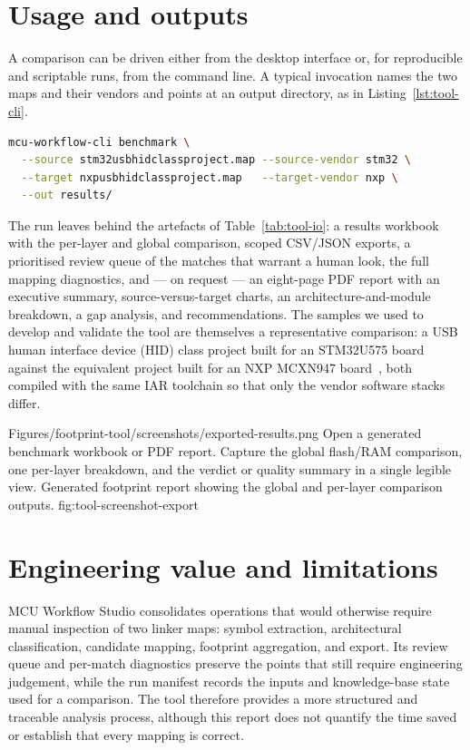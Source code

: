 \section{Usage and outputs}
\label{sec:tool-usage}

A comparison can be driven either from the desktop interface or, for reproducible and scriptable
runs, from the command line. A typical invocation names the two maps and their vendors and points
at an output directory, as in Listing~\ref{lst:tool-cli}.

\lstset{style=mystyle}
\begin{lstlisting}[language=bash, caption={Command-line invocation of a footprint benchmark.}, label={lst:tool-cli}]
mcu-workflow-cli benchmark \
  --source stm32usbhidclassproject.map --source-vendor stm32 \
  --target nxpusbhidclassproject.map   --target-vendor nxp \
  --out results/
\end{lstlisting}

The run leaves behind the artefacts of Table~\ref{tab:tool-io}: a results workbook with the
per-layer and global comparison, scoped CSV/JSON exports, a prioritised review queue of the
matches that warrant a human look, the full mapping diagnostics, and --- on request --- an
eight-page PDF report with an executive summary, source-versus-target charts, an
architecture-and-module breakdown, a gap analysis, and recommendations. The samples we used to
develop and validate the tool are themselves a representative comparison: a USB human interface device (HID)
class project built for an STM32U575 board against the equivalent project built for an NXP
MCXN947 board~\cite{nxp-mcuxpresso}, both compiled with the same IAR toolchain so that only the
vendor software stacks differ.

\reportscreenshot
  {Figures/footprint-tool/screenshots/exported-results.png}
  {Open a generated benchmark workbook or PDF report. Capture the global flash/RAM comparison, one per-layer breakdown, and the verdict or quality summary in a single legible view.}
  {Generated footprint report showing the global and per-layer comparison outputs.}
  {fig:tool-screenshot-export}

\section{Engineering value and limitations}
\label{sec:tool-value}

MCU Workflow Studio consolidates operations that would otherwise require manual inspection
of two linker maps: symbol extraction, architectural classification, candidate mapping,
footprint aggregation, and export. Its review queue and per-match diagnostics preserve the
points that still require engineering judgement, while the run manifest records the inputs
and knowledge-base state used for a comparison. The tool therefore provides a more structured
and traceable analysis process, although this report does not quantify the time saved or
establish that every mapping is correct.

